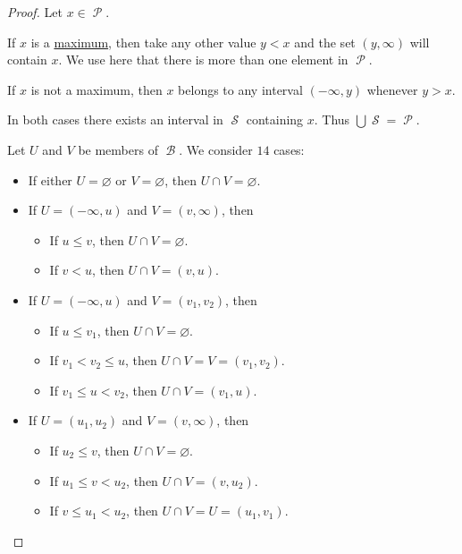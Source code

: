 \begin{proof}
   Let \( x \in \mscrP \).

  If \( x \) is a \hyperref[def:partially_ordered_set_extremal_points/maximum_and_minimum]{maximum}, then take any other value \( y < x \) and the set \( (y, \infty) \) will contain \( x \). We use here that there is more than one element in \( \mscrP \).

  If \( x \) is not a maximum, then \( x \) belongs to any interval \( (-\infty, y) \) whenever \( y > x \).

  In both cases there exists an interval in \( \mscrS \) containing \( x \). Thus \( \bigcup \mscrS = \mscrP \).

   Let \( U \) and \( V \) be members of \( \mscrB \). We consider \( 14 \) cases:
  \begin{itemize}
    \item If either \( U = \varnothing \) or \( V = \varnothing \), then \( U \cap V = \varnothing \).
    \item If \( U = (-\infty, u) \) and \( V = (v, \infty) \), then
    \begin{itemize}
      \item If \( u \leq v \), then \( U \cap V = \varnothing \).
      \item If \( v < u \), then \( U \cap V = (v, u) \).
    \end{itemize}

    \item If \( U = (-\infty, u) \) and \( V = (v_1, v_2) \), then
    \begin{itemize}
      \item If \( u \leq v_1 \), then \( U \cap V = \varnothing \).
      \item If \( v_1 < v_2 \leq u \), then \( U \cap V = V =  (v_1, v_2) \).
      \item If \( v_1 \leq u < v_2 \), then \( U \cap V = (v_1, u) \).
    \end{itemize}

    \item If \( U = (u_1, u_2) \) and \( V = (v, \infty) \), then
    \begin{itemize}
      \item If \( u_2 \leq v \), then \( U \cap V = \varnothing \).
      \item If \( u_1 \leq v < u_2 \), then \( U \cap V = (v, u_2) \).
      \item If \( v \leq u_1 < u_2 \), then \( U \cap V = U = (u_1, v_1) \).
    \end{itemize}


\end{itemize}
\end{proof}
